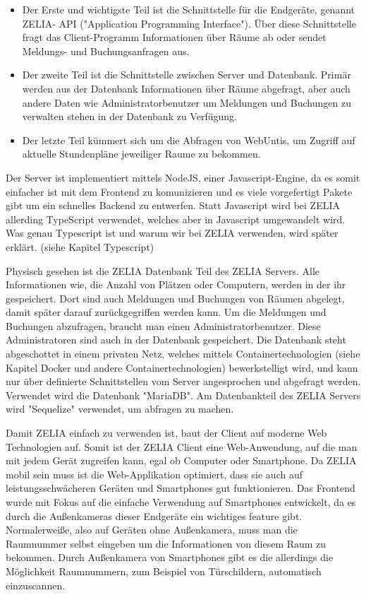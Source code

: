 \begin{itemize}
    \item Der Erste und wichtigste Teil ist die Schnittstelle für die Endgeräte, genannt ZELIA- API ("Application Programming Interface"). Über diese Schnittstelle fragt das Client-Programm Informationen über Räume ab oder sendet Meldungs- und Buchungsanfragen aus.
    \item Der zweite Teil ist die Schnittstelle zwischen Server und Datenbank. Primär werden aus der Datenbank Informationen über Räume abgefragt, aber auch andere Daten wie Administratorbenutzer um Meldungen und Buchungen zu verwalten stehen in der Datenbank zu Verfügung. 
    \item Der letzte Teil kümmert sich um die Abfragen von WebUntis, um Zugriff auf aktuelle Stundenpläne jeweiliger Raume zu bekommen.
\end{itemize}

Der Server ist implementiert mittels NodeJS, einer Javascript-Engine, da es somit einfacher ist mit dem Frontend zu komunizieren und es viele vorgefertigt Pakete gibt um ein schnelles Backend zu entwerfen. Statt Javascript wird bei ZELIA allerding TypeScript verwendet, welches aber in Javascript umgewandelt wird. Was genau Typescript ist und warum wir bei ZELIA verwenden, wird später erklärt. (siehe Kapitel Typescript)


Physisch gesehen ist die ZELIA Datenbank Teil des ZELIA Servers. Alle Informationen wie, die Anzahl von Plätzen oder Computern, werden in der ihr gespeichert. Dort sind auch Meldungen und Buchungen von Räumen abgelegt, damit später darauf zurückgegriffen werden kann. Um die Meldungen und Buchungen abzufragen, braucht man einen Administratorbenutzer. Diese Administratoren sind auch in der Datenbank gespeichert. Die Datenbank steht abgeschottet in einem privaten Netz, welches mittels Containertechnologien (siehe Kapitel Docker und andere Containertechnologien) bewerkstelligt wird, und kann nur über definierte Schnittstellen vom Server angesprochen und abgefragt werden. Verwendet wird die Datenbank "MariaDB". Am Datenbankteil des ZELIA Servers wird "Sequelize" verwendet, um abfragen zu machen.


Damit ZELIA einfach zu verwenden ist, baut der Client auf moderne Web Technologien auf. Somit ist der ZELIA Client eine Web-Anwendung, auf die man mit jedem Gerät zugreifen kann, egal ob Computer oder Smartphone. Da ZELIA mobil sein muss ist die Web-Applikation optimiert, dass sie auch auf leistungsschwächeren Geräten und Smartphones gut funktionieren. Das Frontend wurde mit Fokus auf die einfache Verwendung auf Smartphones entwickelt, da es durch die Außenkameras dieser Endgeräte ein wichtiges feature gibt. Normalerweiße, also auf Geräten ohne Außenkamera, muss man die Raumnummer selbst eingeben um die Informationen von diesem Raum zu bekommen. Durch Außenkamera von Smartphones gibt es die allerdings die Möglichkeit Raumnummern, zum Beispiel von Türschildern, automatisch einzuscannen. 


